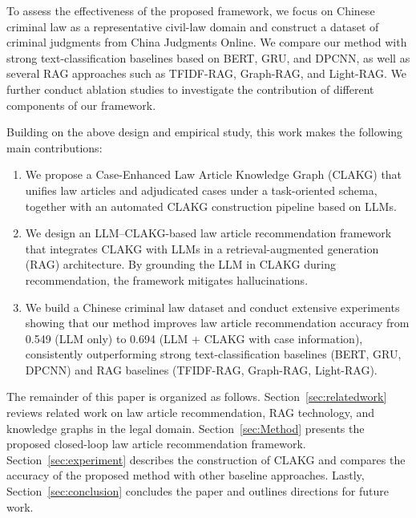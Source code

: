 \documentclass[review,times,nonatbib]{elsarticle} %
\renewcommand{\textcolor}[2]{#2}
\begin{document}
\textcolor{blue}{To assess the effectiveness of the proposed framework, we focus on Chinese criminal law as a representative civil-law domain and construct a dataset of criminal judgments from China Judgments Online. We compare our method with strong text-classification baselines based on BERT\cite{borgeaud2022improving}, GRU\cite{cho2014learning}, and DPCNN\cite{johnson2017deep}, as well as several RAG approaches such as TFIDF-RAG\cite{aizawa2003information}, Graph-RAG\cite{edge2024from}, and Light-RAG\cite{guo2024lightragsimplefastretrievalaugmented}. We further conduct ablation studies to investigate the contribution of different components of our framework.}

\textcolor{blue}{Building on the above design and empirical study, this work makes the following main contributions:}

\begin{enumerate}
  \item We propose a Case-Enhanced Law Article Knowledge Graph (CLAKG) that unifies law articles and adjudicated cases under a task-oriented schema, together with an automated CLAKG construction pipeline based on LLMs.

  \item We design an LLM--CLAKG-based law article recommendation framework that integrates CLAKG with LLMs in a retrieval-augmented generation (RAG) architecture. By grounding the LLM in CLAKG during recommendation, the framework mitigates hallucinations.

  \item We build a Chinese criminal law dataset and conduct extensive experiments showing that our method improves law article recommendation accuracy from 0.549 (LLM only) to 0.694 (LLM + CLAKG with case information), consistently outperforming strong text-classification baselines (BERT, GRU, DPCNN) and RAG baselines (TFIDF-RAG, Graph-RAG, Light-RAG).
\end{enumerate}

The remainder of this paper is organized as follows. Section~\ref{sec:relatedwork} reviews related work on law article recommendation, RAG technology, and knowledge graphs in the legal domain. Section~\ref{sec:Method} presents the proposed closed-loop law article recommendation framework. Section~\ref{sec:experiment} describes the construction of CLAKG and compares the accuracy of the proposed method with other baseline approaches. Lastly, Section~\ref{sec:conclusion} concludes the paper and outlines directions for future work.
\end{document}
